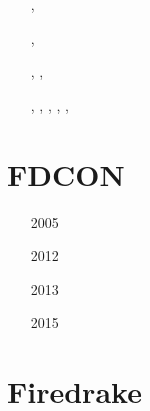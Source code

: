 \begin{small}
\begin{itemize}
\item[\twothousandeleven]    \textcite{thie11},  \textcite{alht11}
\item[\twothousandtwelve]    \textcite{alht12}
\item[\twothousandthirteen]  \textcite{alhf13}
\item[\twothousandfourteen]  \textcite{erhv14},  \textcite{thsh14}
\item[\twothousandfifteen]   \textcite{erhv15}
\item[\twothousandeighteen]  \textcite{sahf18}
\item[\twothousandnineteen]  \textcite{erhv19},  \textcite{thhu19},  \textcite{wohu19}
\item[\twothousandtwentyone] \textcite{erhf21}
\item[\twothousandtwentytwo] \textcite{thhu22},  \textcite{wohb22},  \textcite{erhf22},
                             \textcite{thhl22},  \textcite{pihg22a}, \textcite{pihg22b}
\item[\twothousandtwentythree] \textcite{pihg23}
\item[\twothousandtwentyfour] \textcite{lumh24}
\end{itemize}
\end{small}

\section{FDCON}

\begin{small}
\begin{itemize}
\item[2005] \textcite{enbs05}
\item[2012] \textcite{crsg12}
\item[2013] \textcite{fusc13}
\item[2015] \textcite{fuks15}
\end{itemize}
\end{small}

\section{Firedrake}

